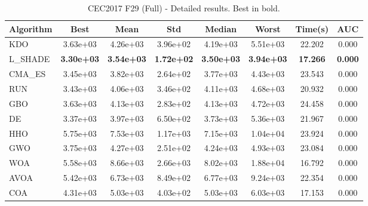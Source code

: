 \begin{table}[H]
\centering\small
\caption{CEC2017 F29 (Full) - Detailed results. Best in bold.}
\label{tab:cec2017_F29}
\begin{tabular}{lccccccc}
\toprule
\textbf{Algorithm} & \textbf{Best} & \textbf{Mean} & \textbf{Std} & \textbf{Median} & \textbf{Worst} & \textbf{Time(s)} & \textbf{AUC} \\
\midrule
KDO & 3.63e+03 & 4.26e+03 & 3.96e+02 & 4.19e+03 & 5.51e+03 & 22.202 & 0.000 \\
L_SHADE & \textbf{3.30e+03} & \textbf{3.54e+03} & \textbf{1.72e+02} & \textbf{3.50e+03} & \textbf{3.94e+03} & \textbf{17.266} & \textbf{0.000} \\
CMA_ES & 3.45e+03 & 3.82e+03 & 2.64e+02 & 3.77e+03 & 4.43e+03 & 23.543 & 0.000 \\
RUN & 3.43e+03 & 4.06e+03 & 3.46e+02 & 4.11e+03 & 4.68e+03 & 20.932 & 0.000 \\
GBO & 3.63e+03 & 4.13e+03 & 2.83e+02 & 4.13e+03 & 4.72e+03 & 24.458 & 0.000 \\
DE & 3.37e+03 & 3.97e+03 & 6.50e+02 & 3.73e+03 & 5.36e+03 & 21.967 & 0.000 \\
HHO & 5.75e+03 & 7.53e+03 & 1.17e+03 & 7.15e+03 & 1.04e+04 & 23.924 & 0.000 \\
GWO & 3.75e+03 & 4.27e+03 & 2.51e+02 & 4.24e+03 & 4.93e+03 & 23.084 & 0.000 \\
WOA & 5.58e+03 & 8.66e+03 & 2.66e+03 & 8.02e+03 & 1.88e+04 & 16.792 & 0.000 \\
AVOA & 5.42e+03 & 6.73e+03 & 8.49e+02 & 6.77e+03 & 9.24e+03 & 22.354 & 0.000 \\
COA & 4.31e+03 & 5.03e+03 & 4.03e+02 & 5.03e+03 & 6.03e+03 & 17.153 & 0.000 \\
\bottomrule
\end{tabular}
\end{table}
